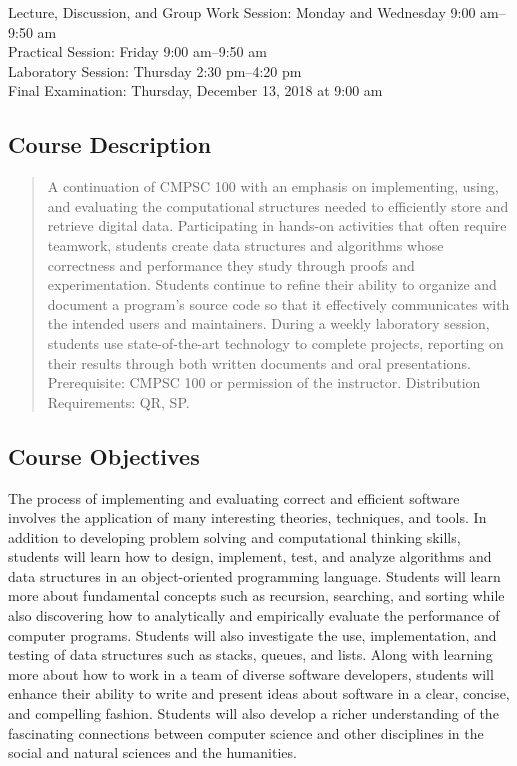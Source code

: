 \documentclass[11pt]{article}
\begin{document}
Lecture, Discussion, and Group Work Session: Monday and Wednesday 9:00 am--9:50 am \\
Practical Session: Friday 9:00 am--9:50 am \\
Laboratory Session: Thursday 2:30 pm--4:20 pm \\
Final Examination: Thursday, December 13, 2018 at 9:00 am

\subsection*{Course Description}

\begin{quote}

A continuation of CMPSC 100 with an emphasis on implementing, using, and
evaluating the computational structures needed to efficiently store and retrieve
digital data. Participating in hands-on activities that often require teamwork,
students create data structures and algorithms whose correctness and performance
they study through proofs and experimentation. Students continue to refine their
ability to organize and document a program's source code so that it effectively
communicates with the intended users and maintainers. During a weekly laboratory
session, students use state-of-the-art technology to complete projects,
reporting on their results through both written documents and oral
presentations. Prerequisite: CMPSC 100 or permission of the instructor.
Distribution Requirements: QR, SP.\@ \\

\end{quote}

\subsection*{Course Objectives}

The process of implementing and evaluating correct and efficient software
involves the application of many interesting theories, techniques, and tools. In
addition to developing problem solving and computational thinking skills, students
will learn how to design, implement, test, and analyze algorithms and data
structures in an object-oriented programming language. Students will learn more
about fundamental concepts such as recursion, searching, and sorting while also
discovering how to analytically and empirically evaluate the performance of
computer programs. Students will also investigate the use, implementation, and
testing of data structures such as stacks, queues, and lists. Along with
learning more about how to work in a team of diverse software developers,
students will enhance their ability to write and present ideas about software in
a clear, concise, and compelling fashion. Students will also develop a richer
understanding of the fascinating connections between computer science and other
disciplines in the social and natural sciences and the humanities.
\end{document}
